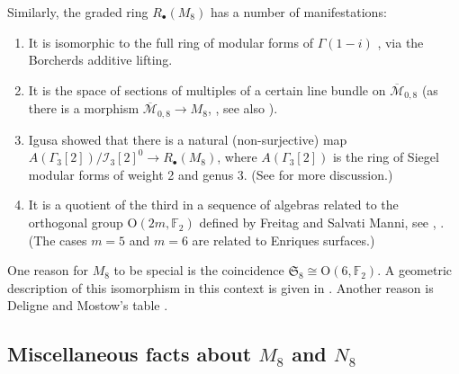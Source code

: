 \documentclass{amsart}
\theoremstyle{definition}
\theoremstyle{remark}
\def\SS{\mathfrak{S}}
\def\F{\mathbb{F}}
\let\mc\mathcal
\let\ol\overline
\begin{document}
Similarly, the graded ring $R_{\bullet}(M_8)$ has a number of manifestations:
\begin{enumerate}
\item It is isomorphic to the full ring of modular forms of $\Gamma(1-i)$ \cite[p.~2]{fs}, via the Borcherds additive
lifting.
\item It is the space of sections of multiples of a certain line bundle on $\ol{\mc{M}}_{0,8}$ (as there is a morphism
$\ol{\mc{M}}_{0,8} \to M_8$, \cite{kapranov}, see also \cite{avritzerlange}).
\item Igusa \cite{igusa} showed that there is a natural
  (non-surjective)  map $A(\Gamma_3[2])/\mc{I}_3[2]^0 \to R_{\bullet}(M_8)$, where
$A(\Gamma_3[2])$ is the ring of Siegel modular forms of weight 2 and genus 3. (See \cite[\S 3]{fs} for more discussion.)\item It is a quotient of the third in a sequence of algebras related to the orthogonal group $\mathrm{O}(2m, \F_2)$
defined by Freitag and Salvati Manni, see \cite{fs1}, \cite[\S 2]{fs}.  (The cases $m=5$ and $m=6$ are related to
Enriques surfaces.)
\end{enumerate}

One reason for $M_8$ to be special is the coincidence $\SS_8 \cong \mathrm{O}(6, \F_2)$.  A geometric description of
this isomorphism in this context is given in \cite[\S 4]{fs}.  Another reason is Deligne and Mostow's table
\cite[p.~86]{dm}.

\subsection{Miscellaneous facts about $M_8$ and $N_8$}
\label{s:miscalgebra}
\end{document}
